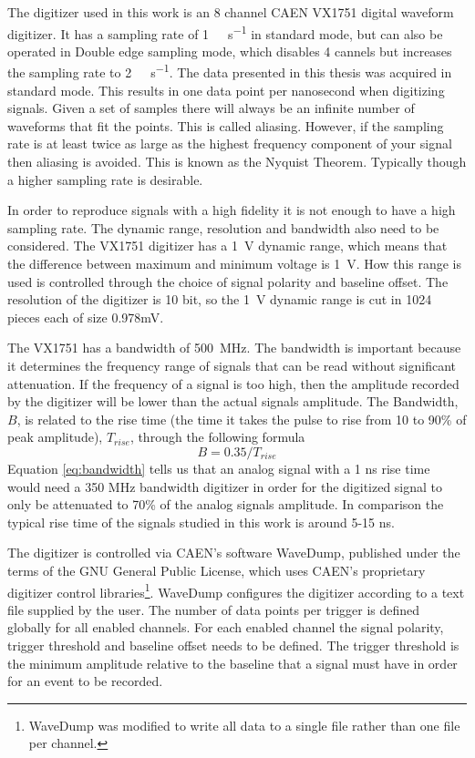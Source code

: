 \documentclass[main.tex]{subfiles}
\begin{document}
The digitizer used in this work is an 8 channel CAEN VX1751 digital waveform digitizer. It has a sampling rate of \si{1\giga\sample\per\second} in standard mode, but can also be operated in Double edge sampling mode, which disables 4 cannels but increases the sampling rate to \si{2\giga\sample\per\second}\cite[p.9]{CAEN}. The data presented in this thesis was acquired in standard mode. This results in one data point per nanosecond when digitizing signals. Given a set of samples there will always be an infinite number of waveforms that fit the points\cite{Spectrum}. This is called aliasing. However, if the sampling rate is at least twice as large as the highest frequency component of your signal then aliasing is avoided. This is known as the Nyquist Theorem. Typically though a higher sampling rate is desirable.

In order to reproduce signals with a high fidelity it is not enough to have a high sampling rate. The dynamic range, resolution and bandwidth also need to be considered. The VX1751 digitizer has a \si{1\volt} dynamic range, which means that the difference between maximum and minimum voltage is \si{1\volt}. How this range is used is controlled through the choice of signal polarity and baseline offset. The resolution of the digitizer is 10 bit, so the \si{1\volt} dynamic range is cut in 1024 pieces each of size 0.978\si{\milli\volt}\cite{CAEN}. 

The VX1751 has a bandwidth of \si{500 \mega\hertz}. The bandwidth is important because it determines the frequency range of signals that can be read without significant attenuation. If the frequency of a signal is too high, then the amplitude recorded by the digitizer will be lower than the actual signals amplitude. The Bandwidth, $B$, is related to the rise time (the time it takes the pulse to rise from 10 to 90\% of peak amplitude), $T_{rise}$, through the following formula\cite[p.354]{Leo}
\begin{equation}
\label{eq:bandwidth}
B=0.35/T_{rise}
\end{equation}
Equation \ref{eq:bandwidth} tells us that an analog signal with a 1 ns rise time would need a 350 MHz bandwidth digitizer in order for the digitized signal to only be attenuated to 70\% of the analog signals amplitude. In comparison the typical rise time of the signals studied in this work is around 5-15 ns.

The digitizer is controlled via CAEN's software WaveDump, published under the terms of the GNU General Public License\cite{WaveDump}, which uses CAEN's proprietary digitizer control libraries\footnote{WaveDump was modified to write all data to a single file rather than one file per channel.}. WaveDump configures the digitizer according to a text file supplied by the user. The number of data points per trigger is defined globally for all enabled channels. For each enabled channel the signal polarity, trigger threshold and baseline offset needs to be defined. The trigger threshold is the minimum amplitude relative to the baseline that a signal must have in order for an event to be recorded. 
\end{document}
